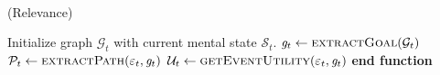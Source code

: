 \documentclass{article}
\begin{document}
\newcommand{\And}{\textit{\textbf{\footnotesize{ AND }}}}
\newcommand{\Or}{\textit{\textbf{\footnotesize{ OR }}}}
\renewcommand{\algorithmicforall}{\textbf{for each}}
\newcommand*\rfrac[2]{{}^{#1}\!/_{#2}}
\newcommand{\mathlowercal}[1]{\textit{\scriptsize{#1}}}

\\

\begin{algorithm}
	\caption{(Relevance)}
	\label{array-sum}
	\begin{algorithmic}[1]
			\Statex
			\State Initialize graph $\mathcal{G}_{t}$ with current mental state
			$\mathcal{S}_{t}$.
			\Statex
			\State $\mathit{g}_{t} \gets \Call{extractGoal}{\mathcal{G}_{t}}$
			\Statex
			\State $\mathcal{P}_{t} \gets \Call{extractPath}{\varepsilon_t,
			\mathit{g}_{t}}$
			\Statex
				\State {}
			\Else
				\State $\mathcal{U}_{t} \gets \Call{getEventUtility}{\varepsilon_t,
				\mathit{g}_{t}}$ 
				\State {}
				\Else
					\State {}
				\EndIf
			\EndIf
		\EndFunction
		\State \textbf{end function}
	\end{algorithmic}
\end{algorithm}
\end{document}
